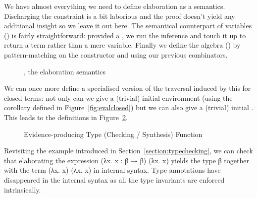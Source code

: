 We have almost everything we need to define elaboration as a semantics. Discharging
the  constraint is a bit laborious and the proof doesn't
yield any additional insight so we leave it out here. The semantical counterpart of
variables () is fairly straightforward: provided a , we run the
inference and touch it up to return a term rather than a mere variable. Finally we
define the algebra () by pattern-matching on the constructor and using our
previous combinators.

\begin{figure}[h]
  \caption{, the elaboration semantics\label{defn:Elaborate}}
\end{figure}

We can once more define a specialised version of the traversal induced by this
 for closed terms: not only can we give a (trivial) initial
environment (using the  corollary defined in Figure~\ref{fig:evalclosed})
but we can also give a (trivial) initial . This leads to the
definitions in Figure~\ref{fig:typedelaboration}.

\begin{figure}[h]
\begin{minipage}{0.45\textwidth}
\end{minipage}\hfill
\begin{minipage}{0.45\textwidth}
\end{minipage}
\caption{Evidence-producing Type (Checking / Synthesis) Function}
\label{fig:typedelaboration}
\end{figure}

Revisiting the example introduced in Section~\ref{section:typechecking},
we can check that elaborating the expression {(λx. x : β → β) (λx. x)}
yields the type {β} together with the term {(λx. x) (λx. x)} in internal
syntax. Type annotations have disappeared in the internal syntax as all
the type invariants are enforced intrinsically.

\begin{figure}[h]
\end{figure}
